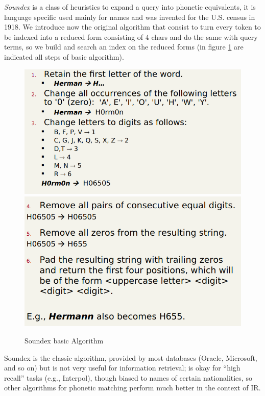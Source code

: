 \emph{Soundex} is a class of heuristics to expand a query into phonetic equivalents, it is language specific used mainly for names
and was invented for the U.S. census in 1918.\newline
We introduce now the original algorithm that consist to turn every token to be indexed into a reduced form consisting of $4$ chars
and do the same with query terms, so we build and search an index on the reduced forms (in figure \ref{img:soundex} are indicated
all steps of basic algorithm).

\begin{figure}
	\caption{Soundex basic Algorithm}
	\label{img:soundex}
	\includegraphics[width=\textwidth]{Images/soundex1}
	\includegraphics[width=\textwidth]{Images/soundex2}
\end{figure}
Soundex is the classic algorithm, provided by most databases (Oracle, Microsoft, and so on) but is not very useful for information retrieval;
is okay for “high recall” tasks (e.g., Interpol), though biased to names of certain nationalities, so other algorithms
for phonetic matching perform much better in the context of IR.


